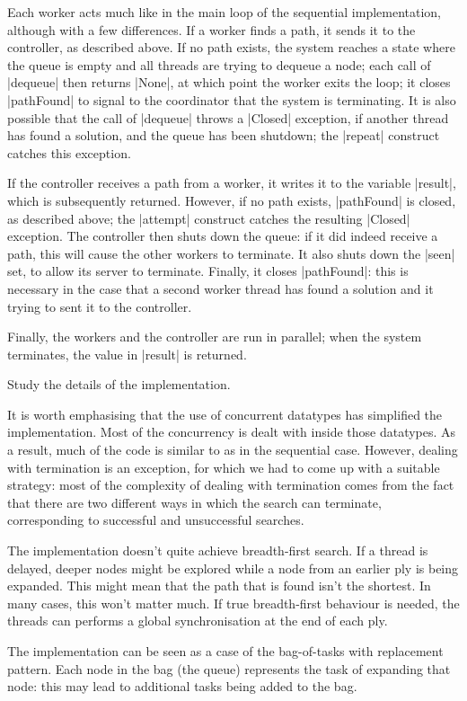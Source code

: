 
Each worker acts much like in the main loop of the sequential implementation,
although with a few differences.  If a worker finds a path, it sends it to the
controller, as described above.  If no path exists, the system reaches a state
where the queue is empty and all threads are trying to dequeue a node; each
call of |dequeue| then returns |None|, at which point the worker exits the
loop; it closes |pathFound| to signal to the coordinator that the system is
terminating.  It is also possible that the call of |dequeue| throws a |Closed|
exception, if another thread has found a solution, and the queue has been
shutdown; the |repeat| construct catches this exception.

If the controller receives a path from a worker, it writes it to the variable
|result|, which is subsequently returned.  However, if no path exists,
|pathFound| is closed, as described above; the |attempt| construct catches the
resulting |Closed| exception.  The controller then shuts down the queue: if it
did indeed receive a path, this will cause the other workers to terminate.  It
also shuts down the |seen| set, to allow its server to terminate.  Finally, it
closes |pathFound|: this is necessary in the case that a second worker thread
has found a solution and it trying to sent it to the controller. 

Finally, the workers and the controller are run in parallel; when the system
terminates, the value in |result| is returned. 

\begin{instruction}
Study the details of the implementation.
\end{instruction}

It is worth emphasising that the use of concurrent datatypes has simplified
the implementation.  Most of the concurrency is dealt with inside those
datatypes.  As a result, much of the code is similar to as in the sequential
case.  However, dealing with termination is an exception, for which we had to
come up with a suitable strategy: most of the complexity of dealing with
termination comes from the fact that there are two different ways
in which the search can terminate, corresponding to successful and
unsuccessful searches. 

The implementation doesn't quite achieve breadth-first search.  If a thread is
delayed, deeper nodes might be explored while a node from an earlier ply is
being expanded.  This might mean that the path that is found isn't the
shortest.  In many cases, this won't matter much.  If true breadth-first
behaviour is needed, the threads can performs a global synchronisation at the
end of each ply.

The implementation can be seen as a case of the bag-of-tasks with replacement
pattern.  Each node in the bag (the queue) represents the task of expanding
that node: this may lead to additional tasks being added to the bag.

